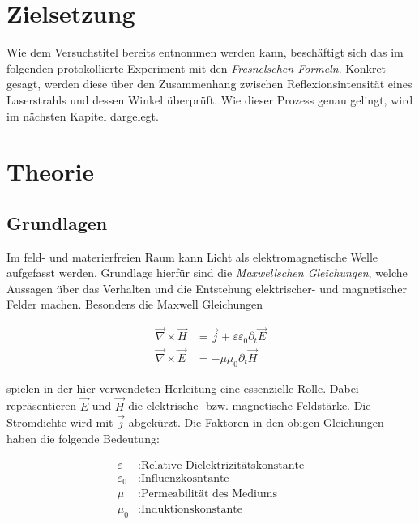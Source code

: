 %

%

\section{Zielsetzung}
\label{sec:Zielsetzung}

Wie dem Versuchstitel bereits entnommen werden kann, beschäftigt sich das im folgenden protokollierte Experiment mit den \emph{Fresnelschen Formeln}.
Konkret gesagt, werden diese über den Zusammenhang zwischen Reflexionsintensität eines Laserstrahls und dessen Winkel überprüft. Wie dieser Prozess genau 
gelingt, wird im nächsten Kapitel dargelegt. 

\section{Theorie}
\label{sec:Theorie}


\subsection{Grundlagen}
\label{sec:Grundlagen}

Im feld- und materierfreien Raum kann Licht als elektromagnetische Welle aufgefasst werden. Grundlage hierfür sind die \emph{Maxwellschen Gleichungen}, 
welche Aussagen über das Verhalten und die Entstehung elektrischer- und magnetischer Felder machen. Besonders die Maxwell Gleichungen

\begin{align}
\label{eqn:MW34}
    \vec{\nabla}\times\vec{H} &= \vec{j} + \varepsilon\varepsilon_0\partial_{t}\vec{E}\\
    \vec{\nabla}\times\vec{E} &= -\mu\mu_0\partial_{t}\vec{H}
\end{align}

\noindent spielen in der hier verwendeten Herleitung eine essenzielle Rolle. Dabei repräsentieren $\vec{E}$ und $\vec{H}$ die elektrische- bzw. magnetische 
Feldstärke. Die Stromdichte wird mit $\vec{j}$ abgekürzt. Die Faktoren in den obigen Gleichungen haben die folgende Bedeutung:

\begin{align*}
    \varepsilon &: \text{Relative Dielektrizitätskonstante}\\
    \varepsilon_0 &: \text{Influenzkosntante}\\
    \mu &: \text{Permeabilität des Mediums}\\
    \mu_0 &: \text{Induktionskonstante}
\end{align*}

